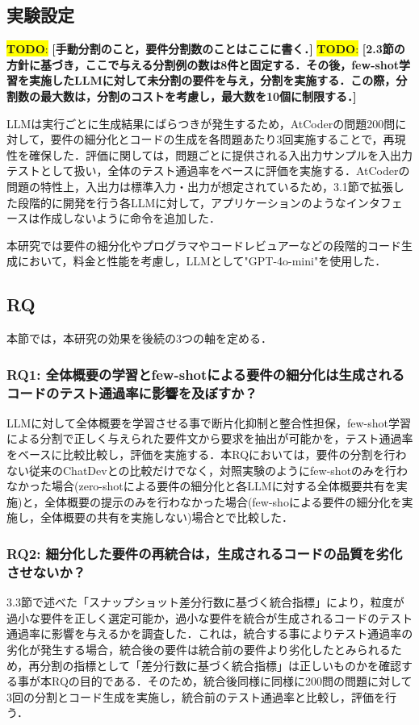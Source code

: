 \documentclass[submit,techrep,noauthor]{ipsj}
\newcommand{\todo}[1]{\colorbox{yellow}{{\bf TODO}:}{\color{red} {\textbf{[#1]}}}}
\begin{document}
\subsection{実験設定}
\todo{手動分割のこと，要件分割数のことはここに書く．}
\todo{2.3節の方針に基づき，ここで与える分割例の数は8件と固定する．その後，few-shot学習を実施したLLMに対して未分割の要件を与え，分割を実施する．この際，分割数の最大数は，分割のコストを考慮し，最大数を10個に制限する．}

LLMは実行ごとに生成結果にばらつきが発生するため，AtCoderの問題200問に対して，要件の細分化とコードの生成を各問題あたり3回実施することで，再現性を確保した．評価に関しては，問題ごとに提供される入出力サンプルを入出力テストとして扱い，全体のテスト通過率をベースに評価を実施する．AtCoderの問題の特性上，入出力は標準入力・出力が想定されているため，3.1節で拡張した段階的に開発を行う各LLMに対して，アプリケーションのようなインタフェースは作成しないように命令を追加した．

本研究では要件の細分化やプログラマやコードレビュアーなどの段階的コード生成において，料金と性能を考慮し，LLMとして"GPT-4o-mini"\cite{openai_gpt_4o_mini}を使用した．


\subsection{RQ}
本節では，本研究の効果を後続の3つの軸を定める．

\subsubsection{RQ1: 全体概要の学習とfew-shotによる要件の細分化は生成されるコードのテスト通過率に影響を及ぼすか？}
LLMに対して全体概要を学習させる事で断片化抑制と整合性担保，few-shot学習による分割で正しく与えられた要件文から要求を抽出が可能かを，テスト通過率をベースに比較比較し，評価を実施する．本RQにおいては，要件の分割を行わない従来のChatDevとの比較だけでなく，対照実験のようにfew-shotのみを行わなかった場合(zero-shotによる要件の細分化と各LLMに対する全体概要共有を実施)と，全体概要の提示のみを行わなかった場合(few-shoによる要件の細分化を実施し，全体概要の共有を実施しない)場合とで比較した．

\subsubsection{RQ2: 細分化した要件の再統合は，生成されるコードの品質を劣化させないか？}
3.3節で述べた「スナップショット差分行数に基づく統合指標」により，粒度が過小な要件を正しく選定可能か，過小な要件を統合が生成されるコードのテスト通過率に影響を与えるかを調査した．これは，統合する事によりテスト通過率の劣化が発生する場合，統合後の要件は統合前の要件より劣化したとみられるため，再分割の指標として「差分行数に基づく統合指標」は正しいものかを確認する事が本RQの目的である．そのため，統合後同様に同様に200問の問題に対して3回の分割とコード生成を実施し，統合前のテスト通過率と比較し，評価を行う．
\end{document}

